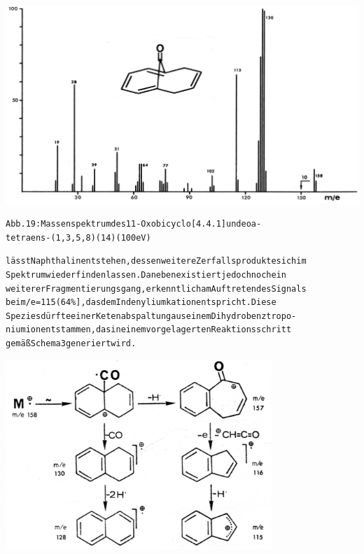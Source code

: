 \documentclass[a4paper,11pt]{article}
\begin{document}
\hspace*{-0.25cm}\includegraphics[width=14.39cm]{MASS_019}
\begin{alltt}
Abb. 19: Massenspektrum des 11-Oxobicyclo[4.4.1]undeoa-
tetraens-(1‚3,5‚8) (14) (100 eV)

\newpage
{}

lässt Naphthalin entstehen, dessen weitere Zerfallsprodukte sich im
Spektrum wiederfinden lassen. Daneben existiert jedoch noch ein
weiterer Fragmentierungsgang, erkenntlich am Auftreten des Signals
bei m/e = 115 (64 \%], das dem Indenyliumkation entspricht. Diese
Spezies dürfte einer Ketenabspaltung aus einem Dihydrobenztropo-
niumion entstammen, das in einem vorgelagerten Reaktionsschritt
gemäß Schema 3 generiert wird.
\end{alltt}
\hspace*{0.5cm}\includegraphics[width=10.05cm]{SCHEMA_003}
\end{document}
